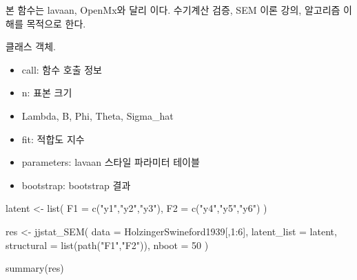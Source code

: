 \documentclass[a4paper]{book}
\begin{document}
%
\begin{Details}
본 함수는 lavaan, OpenMx와 달리
이다.
수기계산 검증, SEM 이론 강의, 알고리즘 이해를 목적으로 한다.
\end{Details}
%
\begin{Value}
 클래스 객체.
\begin{itemize}

\item{} call: 함수 호출 정보
\item{} n: 표본 크기
\item{} Lambda, B, Phi, Theta, Sigma\_hat
\item{} fit: 적합도 지수
\item{} parameters: lavaan 스타일 파라미터 테이블
\item{} bootstrap: bootstrap 결과

\end{itemize}

\end{Value}
%
\begin{Examples}
\begin{ExampleCode}
latent <- list(
  F1 = c("y1","y2","y3"),
  F2 = c("y4","y5","y6")
)

res <- jjstat_SEM(
  data = HolzingerSwineford1939[,1:6],
  latent_list = latent,
  structural = list(path("F1","F2")),
  nboot = 50
)

summary(res)

\end{ExampleCode}
\end{Examples}
\end{document}
